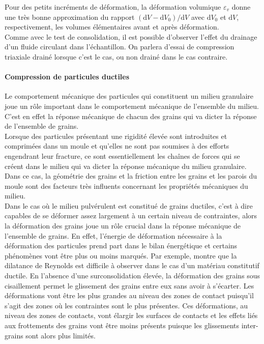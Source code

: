 				Pour des petits incréments de déformation, la déformation volumique $\varepsilon_v$ donne une très bonne approximation du rapport $(\mathrm{d}V-\mathrm{d}V_0)/\mathrm{d}V$ avec $\mathrm{d}V_0$ et $\mathrm{d}V$, respectivement, les volumes élémentaires avant et après déformation.
				\\\indent Comme avec le test de consolidation, il est possible d'observer l'effet du drainage d'un fluide circulant dans l'échantillon. On parlera d'essai de compression triaxiale drainé lorsque c'est le cas, ou non drainé dans le cas contraire.
		\paragraph{Compression de particules ductiles\\}
			Le comportement mécanique des particules qui constituent un milieu granulaire joue un rôle important dans le comportement mécanique de l'ensemble du milieu. C'est en effet la réponse mécanique de chacun des grains qui va dicter la réponse de l'ensemble de grains.
			\\Lorsque des particules présentant une rigidité élevée sont introduites et comprimées dans un moule et qu'elles ne sont pas soumises à des efforts engendrant leur fracture, ce sont essentiellement les chaînes de forces qui se créent dans le milieu qui va dicter la réponse mécanique du milieu granulaire. Dans ce cas, la géométrie des grains et la friction entre les grains et les parois du moule sont des facteurs très influents concernant les propriétés mécaniques du milieu.
			\\Dans le cas où le milieu pulvérulent est constitué de grains ductiles, c'est à dire capables de se déformer assez largement à un certain niveau de contraintes, alors la déformation des grains joue un rôle crucial dans la réponse mécanique de l'ensemble de grains. En effet, l'énergie de déformation nécessaire à la déformation des particules prend part dans le bilan énergétique et certains phénomènes vont être plus ou moins marqués. Par exemple, \citet{pavier_caracterisation_1998} montre que la dilatance de Reynolds est difficile à observer dans le cas d'un matériau constitutif ductile. En l'absence d'une surconsolidation élevée, la déformation des grains sous cisaillement permet le glissement des grains entre eux sans avoir à s'écarter. Les déformations vont être les plus grandes au niveau des zones de contact puisqu'il s'agit des zones où les contraintes sont le plus présentes. Ces déformations, au niveau des zones de contacts, vont élargir les surfaces de contacts et les effets liés aux frottements des grains vont être moins présents puisque les glissements inter-grains sont alors plus limités.
